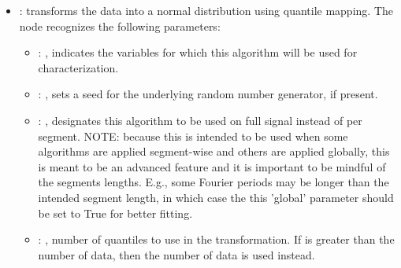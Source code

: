 \begin{itemize}
    \item {}:
      transforms the data into a normal distribution using quantile mapping.
      The  node recognizes the following parameters:
        \begin{itemize}
          \item {}: ,
            indicates the variables for which this algorithm will be used for characterization.
          \item {}: ,
            sets a seed for the underlying random number generator, if present.
          \item {}: ,
            designates this algorithm to be used on full signal instead of per
            segment. NOTE: because this is intended to be used when some algorithms are
            applied segment-wise and others are applied globally, this is meant to be an
            advanced feature and it is important to be mindful of the segments lengths.
            E.g., some Fourier periods may be longer than the intended segment length, in
            which case the this 'global' parameter should be set to True for better
            fitting. 
          \item {}: ,
            number of quantiles to use in the transformation. If 
            is greater than the number of data, then the number of data is used instead. 
      \end{itemize}


\end{itemize}
